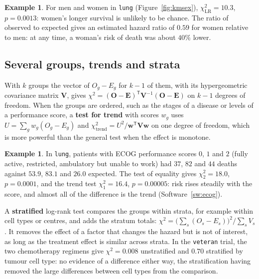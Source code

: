 \documentclass[11pt,a4paper]{article}
\numberwithin{equation}{section}
\theoremstyle{definition}
\newtheorem{exa}[thm]{Example}
\begin{document}
\begin{exa}
\label{ex:lungsex}
For men and women in \texttt{lung} (Figure~\ref{fig:kmsex}), $\chi^2_{\text{LR}} = 10.3$, $p = 0.0013$: women's longer survival is unlikely to be chance. The ratio of observed to expected gives an estimated hazard ratio of $0.59$ for women relative to men: at any time, a woman's risk of death was about $40\%$ lower.
\end{exa}

\subsection{Several groups, trends and strata}
\label{ssec:kgroups}

With $k$ groups the vector of $O_g - E_g$ for $k - 1$ of them, with its hypergeometric covariance matrix $\mathbf V$, gives $\chi^2 = (\mathbf O - \mathbf E)^{\mathsf T}\mathbf V^{-1}(\mathbf O - \mathbf E)$ on $k - 1$ degrees of freedom. When the groups are ordered, such as the stages of a disease or levels of a performance score, a \textbf{test for trend} with scores
$w_g$ uses $U = \sum_gw_g(O_g - E_g)$ and $\chi^2_{\text{trend}} = U^2/\mathbf w^{\mathsf T}\mathbf V\mathbf w$ on one degree of freedom, which is more powerful than the general test when the effect is monotone.

\begin{exa}
\label{ex:ecog}
In \texttt{lung}, patients with ECOG performance scores $0$, $1$ and $2$ (fully active, restricted, ambulatory but unable to work) had $37$, $82$ and $44$ deaths against $53.9$, $83.1$ and $26.0$ expected. The test of equality gives $\chi^2_2 = 18.0$, $p = 0.0001$, and the trend test $\chi^2_1 = 16.4$, $p = 0.00005$: risk rises steadily with the score, and almost
all of the difference is the trend (Software~\ref{sw:ecog}).
\end{exa}

A \textbf{stratified} log-rank test compares the groups within strata, for example within cell types or centres, and adds the stratum totals: $\chi^2 = \bigl(\sum_s(O_s - E_s)\bigr)^2/\sum_sV_s$. It removes the effect of a factor that changes the hazard but is not of interest, as long as the treatment effect is similar across strata. In the \texttt{veteran}
trial, the two chemotherapy regimens give $\chi^2 = 0.008$ unstratified and $0.70$ stratified by tumour cell type: no evidence of a difference either way, the stratification having removed the large differences between cell types from the comparison.
\end{document}
